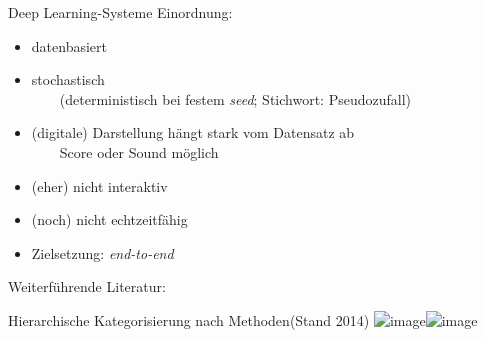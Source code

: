 \begin{frame}{Deep Learning-Systeme}
		Einordnung:
		\begin{itemize}
			\item datenbasiert
			\item stochastisch\\
			~~~\conclude~{\small(deterministisch bei festem \emph{seed}; Stichwort: Pseudozufall)}
			\item (digitale) Darstellung hängt stark vom Datensatz ab\\
			~~~\conclude~{\small Score oder Sound möglich}
			\item (eher) nicht interaktiv
			\item (noch) nicht echtzeitfähig
			\item Zielsetzung: \emph{end-to-end}
		\end{itemize}
		
		\vspace{-2.2cm}
		\hfill Weiterführende Literatur: 
\end{frame}

\begin{frame}{Hierarchische Kategorisierung nach Methoden}{(Stand 2014)}
	\centering
	\includegraphics<1>[height=.75\textheight]{img/AI_Methods_For_AlgoComp_Overview.png}\includegraphics<2>[height=.8\textheight]{img/AI_Methods_For_AlgoComp_Overview_mark.png}\citep{FernandezVico2013}
\end{frame}

